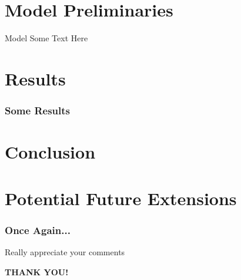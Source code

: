 \documentclass[Serif, 10pt, brown]{beamer}
\theoremstyle{example}
\theoremstyle{plain}
\begin{document}
\section[Model Prelim.]{Model Preliminaries}
\begin{frame}{Model}
	Some Text Here 
\end{frame}


\section[Results]{Results}
\begin{frame}
	\frametitle{Some Results}
\end{frame}


\section[Conclusion]{Conclusion}


\section[Potential Future Extensions]{Potential Future Extensions}


\begin{frame}
	\frametitle{Once Again...}
	\begin{block}{Really appreciate your comments}
		\begin{center} \alert{\Huge\bf THANK YOU!} \end{center}
	\end{block}
\end{frame}

\appendix
{}
\end{document}
